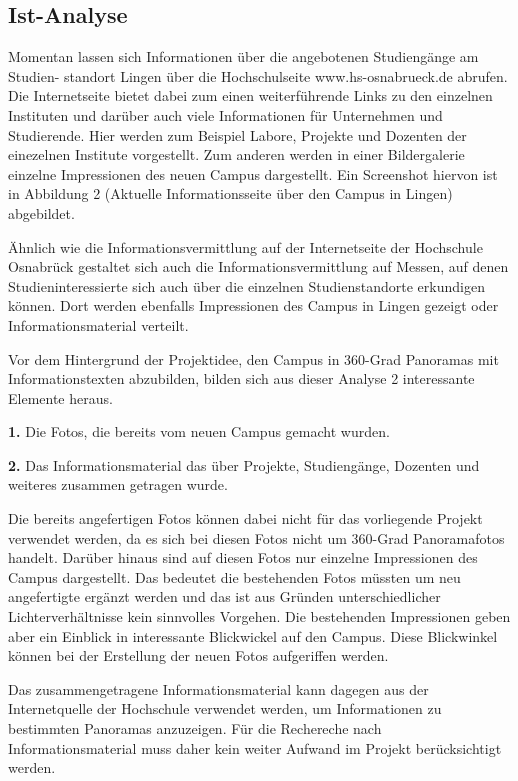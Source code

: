 \subsection{Ist-Analyse}
\label{sec:IstAnalyse}

Momentan lassen sich Informationen über die angebotenen Studiengänge am Studien-
standort Lingen über die Hochschulseite www.hs-osnabrueck.de abrufen. Die Internetseite bietet dabei zum einen 
weiterführende Links zu den einzelnen Instituten und darüber auch viele Informationen für Unternehmen und Studierende.
Hier werden zum Beispiel Labore, Projekte und Dozenten der einezelnen Institute vorgestellt. Zum anderen werden in einer 
Bildergalerie einzelne Impressionen des neuen Campus dargestellt. Ein Screenshot hiervon ist in Abbildung 2 (Aktuelle 
Informationsseite über den Campus in Lingen) abgebildet.



Ähnlich wie die Informationsvermittlung auf der Internetseite der Hochschule Osnabrück
gestaltet sich auch die Informationsvermittlung auf Messen, auf denen Studieninteressierte
sich auch über die einzelnen Studienstandorte erkundigen können. Dort werden ebenfalls
Impressionen des Campus in Lingen gezeigt oder Informationsmaterial verteilt.

Vor dem Hintergrund der Projektidee, den Campus in 360-Grad Panoramas mit Informationstexten abzubilden, bilden sich aus 
dieser Analyse 2 interessante Elemente heraus.

\textbf{1.} Die Fotos, die bereits vom neuen Campus gemacht wurden.

\textbf{2.} Das Informationsmaterial das über Projekte, Studiengänge, Dozenten und weiteres zusammen getragen wurde.

Die bereits angefertigen Fotos können dabei nicht für das vorliegende Projekt verwendet werden, da es sich bei diesen 
Fotos nicht um 360-Grad Panoramafotos handelt. Darüber hinaus sind auf diesen Fotos nur einzelne Impressionen des Campus 
dargestellt. Das bedeutet die bestehenden Fotos müssten um neu angefertigte ergänzt werden und das ist aus Gründen 
unterschiedlicher Lichterverhältnisse kein sinnvolles Vorgehen. Die bestehenden Impressionen geben aber ein Einblick in 
interessante Blickwickel auf den Campus. Diese Blickwinkel können bei der Erstellung der neuen Fotos aufgeriffen werden. 

Das zusammengetragene Informationsmaterial kann dagegen aus der Internetquelle der Hochschule verwendet werden, um 
Informationen zu bestimmten Panoramas anzuzeigen. Für die Rechereche nach Informationsmaterial muss daher kein weiter 
Aufwand im Projekt berücksichtigt werden.